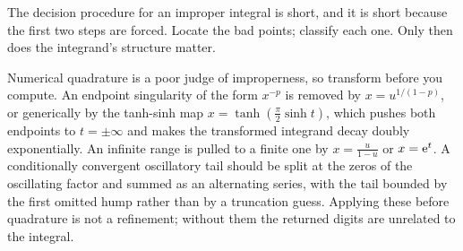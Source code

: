 The decision procedure for an improper integral is short, and it is short because the first two steps are forced. Locate the bad points; classify each one. Only then does the integrand's structure matter.

\begin{center}
\end{center}

\begin{keynote}
Numerical quadrature is a poor judge of improperness, so transform before you compute. An endpoint singularity of the form $x^{-p}$ is removed by $x=u^{1/(1-p)}$, or generically by the tanh-sinh map $x=\tanh(\tfrac\pi2\sinh t)$, which pushes both endpoints to $t=\pm\infty$ and makes the transformed integrand decay doubly exponentially. An infinite range is pulled to a finite one by $x=\tfrac{u}{1-u}$ or $x=\mathrm{e}^{t}$. A conditionally convergent oscillatory tail should be split at the zeros of the oscillating factor and summed as an alternating series, with the tail bounded by the first omitted hump rather than by a truncation guess. Applying these before quadrature is not a refinement; without them the returned digits are unrelated to the integral.
\end{keynote}

